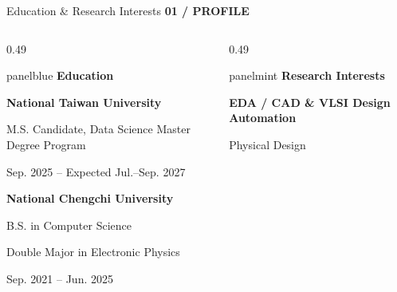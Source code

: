 \documentclass[aspectratio=169,10pt]{beamer}
\newcommand{\smalllabel}[1]{{\scriptsize\bfseries\color{Accent}\MakeUppercase{#1}}}
\newcommand{\slidenavigation}{}
\newcommand{\slideposition}{}
\newcommand{\slidesubtitle}[1]{%
  \smalllabel{#1}%
}
\begin{document}
\renewcommand{\slidenavigation}{\hyperlink{details-index}{\beamerbutton{Details index}}}
\renewcommand{\slideposition}{Summary 2 / 18}
\begin{frame}[label=summary-2]{Education \& Research Interests}
  \vspace{0.05cm}
  \slidesubtitle{01 / Profile}\par\vspace{0.10cm}
  \vfill
  \begin{columns}[T,onlytextwidth]
    \begin{column}{0.49\textwidth}
      \begin{beamercolorbox}[rounded=true,sep=0.20cm,wd=\linewidth]{panelblue}
        {\large\bfseries\color{AccentBlue}Education}\par
        \vspace{0.14cm}
        {\normalsize\bfseries National Taiwan University}\par
        {\normalsize M.S. Candidate, Data Science Master Degree Program}\par
        {\small\color{Muted}Sep. 2025 -- Expected Jul.--Sep. 2027}\par
        \vspace{0.23cm}
        {\normalsize\bfseries National Chengchi University}\par
        {\normalsize B.S. in Computer Science}\par
        {\normalsize Double Major in Electronic Physics}\par
        {\small\color{Muted}Sep. 2021 -- Jun. 2025}
      \end{beamercolorbox}
    \end{column}
    \begin{column}{0.49\textwidth}
      \begin{beamercolorbox}[rounded=true,sep=0.20cm,wd=\linewidth]{panelmint}
        {\large\bfseries\color{Accent}Research Interests}\par
        \vspace{0.15cm}
        {\normalsize\bfseries EDA / CAD \& VLSI Design Automation}\par
        \vspace{0.09cm}
        {\normalsize Physical Design}\par

\end{beamercolorbox}
\end{column}
\end{columns}
\end{frame}
\end{document}
